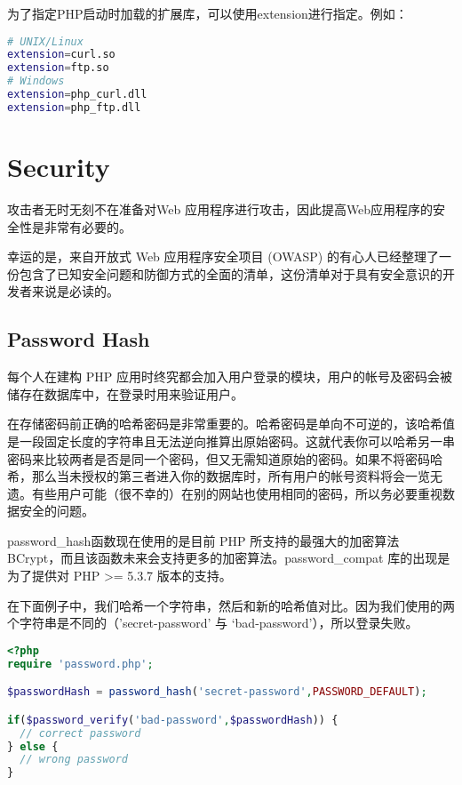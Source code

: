 为了指定PHP启动时加载的扩展库，可以使用extension进行指定。例如：

\begin{lstlisting}[language=bash]
# UNIX/Linux
extension=curl.so
extension=ftp.so
# Windows
extension=php_curl.dll
extension=php_ftp.dll
\end{lstlisting}



\chapter{Security}

攻击者无时无刻不在准备对Web 应用程序进行攻击，因此提高Web应用程序的安全性是非常有必要的。

幸运的是，来自开放式 Web 应用程序安全项目 (OWASP) 的有心人已经整理了一份包含了已知安全问题和防御方式的全面的清单，这份清单对于具有安全意识的开发者来说是必读的。






\section{Password Hash}

每个人在建构 PHP 应用时终究都会加入用户登录的模块，用户的帐号及密码会被储存在数据库中，在登录时用来验证用户。

在存储密码前正确的哈希密码是非常重要的。哈希密码是单向不可逆的，该哈希值是一段固定长度的字符串且无法逆向推算出原始密码。这就代表你可以哈希另一串密码来比较两者是否是同一个密码，但又无需知道原始的密码。如果不将密码哈希，那么当未授权的第三者进入你的数据库时，所有用户的帐号资料将会一览无遗。有些用户可能（很不幸的）在别的网站也使用相同的密码，所以务必要重视数据安全的问题。

password\_hash函数现在使用的是目前 PHP 所支持的最强大的加密算法 BCrypt，而且该函数未来会支持更多的加密算法。password\_compat 库的出现是为了提供对 PHP >= 5.3.7 版本的支持。

在下面例子中，我们哈希一个字符串，然后和新的哈希值对比。因为我们使用的两个字符串是不同的（’secret-password’ 与 ‘bad-password’），所以登录失败。

\begin{lstlisting}[language=PHP]
<?php 
require 'password.php';

$passwordHash = password_hash('secret-password',PASSWORD_DEFAULT);

if($password_verify('bad-password',$passwordHash)) {
  // correct password
} else {
  // wrong password
}
\end{lstlisting}


